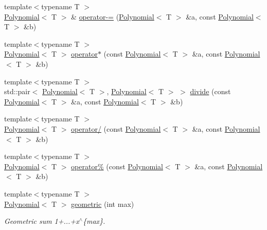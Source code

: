 \begin{DoxyCompactItemize}
\item 
{\footnotesize template$<$typename T $>$ }\\\hyperlink{classMackey_1_1Polynomial}{Polynomial}$<$ T $>$ \& \hyperlink{namespaceMackey_a9cb1fbb70826d41d001bef40d09d9e3f}{operator-\/=} (\hyperlink{classMackey_1_1Polynomial}{Polynomial}$<$ T $>$ \&a, const \hyperlink{classMackey_1_1Polynomial}{Polynomial}$<$ T $>$ \&b)
\item 
{\footnotesize template$<$typename T $>$ }\\\hyperlink{classMackey_1_1Polynomial}{Polynomial}$<$ T $>$ \hyperlink{namespaceMackey_a7bbd83e8170a608aea65f7d916b4bc6d}{operator$\ast$} (const \hyperlink{classMackey_1_1Polynomial}{Polynomial}$<$ T $>$ \&a, const \hyperlink{classMackey_1_1Polynomial}{Polynomial}$<$ T $>$ \&b)
\item 
{\footnotesize template$<$typename T $>$ }\\std\+::pair$<$ \hyperlink{classMackey_1_1Polynomial}{Polynomial}$<$ T $>$, \hyperlink{classMackey_1_1Polynomial}{Polynomial}$<$ T $>$ $>$ \hyperlink{namespaceMackey_a04fadcf186ab504cafeb259178ee4827}{divide} (const \hyperlink{classMackey_1_1Polynomial}{Polynomial}$<$ T $>$ \&a, const \hyperlink{classMackey_1_1Polynomial}{Polynomial}$<$ T $>$ \&b)
\item 
{\footnotesize template$<$typename T $>$ }\\\hyperlink{classMackey_1_1Polynomial}{Polynomial}$<$ T $>$ \hyperlink{namespaceMackey_ac26fb6e8a8b7350d13f866570d588e6c}{operator/} (const \hyperlink{classMackey_1_1Polynomial}{Polynomial}$<$ T $>$ \&a, const \hyperlink{classMackey_1_1Polynomial}{Polynomial}$<$ T $>$ \&b)
\item 
{\footnotesize template$<$typename T $>$ }\\\hyperlink{classMackey_1_1Polynomial}{Polynomial}$<$ T $>$ \hyperlink{namespaceMackey_adb145e729d40138080b5a58d26a89388}{operator\%} (const \hyperlink{classMackey_1_1Polynomial}{Polynomial}$<$ T $>$ \&a, const \hyperlink{classMackey_1_1Polynomial}{Polynomial}$<$ T $>$ \&b)
\item 
{\footnotesize template$<$typename T $>$ }\\\hyperlink{classMackey_1_1Polynomial}{Polynomial}$<$ T $>$ \hyperlink{namespaceMackey_a2b9319a9af0a3cad8cfec47e9197dc82}{geometric} (int max)
\begin{DoxyCompactList}\small\item\em Geometric sum 1+...+x$^\wedge$\{max\}. \end{DoxyCompactList}\item 

\end{DoxyCompactItemize}
